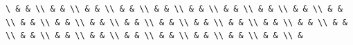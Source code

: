 \documentclass[
  ukrainian,
]{article}
\begin{document}
\begin{verbatim}
\ & & \\ & & \\ & & \\ & & \\ & & \\ & & \\ & & \\ & & \\ & & \\ & & \\ & & \\ & & \\ & & \\ & & \\ & & \\ & & \\ & & \\ & & \\ & & \\ & & \\ & & \\ & & \\ & & \\ & & \\ & & \\ & & \\ & & \\ & & \\ &
\end{verbatim}
\end{document}
